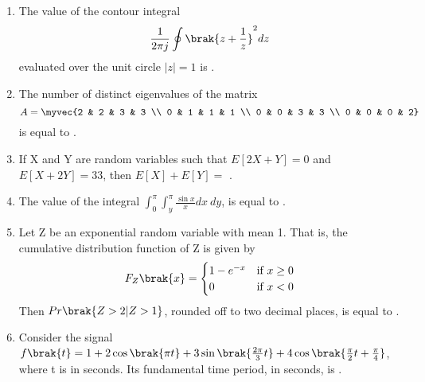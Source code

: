 \documentclass[a4paper, 11pt]{article}
\begin{document}
\begin{enumerate}
    \hfill{}

    \item The value of the contour integral
    \[
    \frac{1}{2\pi j}\oint\brak{z+\frac{1}{z}}^{2}dz
    \]
    evaluated over the unit circle $|z|=1$ is \underline{\hspace{2cm}}.
    
    \hfill{}

    \item The number of distinct eigenvalues of the matrix
    \[
    A = \myvec{2 & 2 & 3 & 3 \\ 0 & 1 & 1 & 1 \\ 0 & 0 & 3 & 3 \\ 0 & 0 & 0 & 2}
    \]
    is equal to \underline{\hspace{2cm}}.
    
    \hfill{}
    
    \item If X and Y are random variables such that $E[2X+Y]=0$ and $E[X+2Y]=33$, then $E[X]+E[Y] = $ \underline{\hspace{2cm}}.

    \hfill{}

    \item The value of the integral $\int_{0}^{\pi}\int_{y}^{\pi}\frac{\sin x}{x}dx~dy$, is equal to \underline{\hspace{2cm}}.
    
    \hfill{}

    \item Let Z be an exponential random variable with mean 1. That is, the cumulative distribution function of Z is given by
    \[
    F_{Z}\brak{x} = 
    \begin{cases}
        1-e^{-x} & \text{if } x \ge 0 \\
        0 & \text{if } x < 0
    \end{cases}
    \]
    Then $Pr\brak{Z>2|Z>1}$, rounded off to two decimal places, is equal to \underline{\hspace{2cm}}.
    
    \hfill{}

    \item Consider the signal $f\brak{t}=1+2\cos\brak{\pi t}+3\sin\brak{\frac{2\pi}{3}t}+4\cos\brak{\frac{\pi}{2}t+\frac{\pi}{4}}$, where t is in seconds. Its fundamental time period, in seconds, is \underline{\hspace{2cm}}.
    

\end{enumerate}
\end{document}
